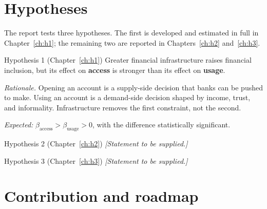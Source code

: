 \section{Hypotheses}
\label{sec:hypotheses}

The report tests three hypotheses. The first is developed and estimated in full in
Chapter~\ref{ch:h1}; the remaining two are reported in Chapters~\ref{ch:h2} and~\ref{ch:h3}.

\begin{keybox}{Hypothesis 1 (Chapter~\ref{ch:h1})}
Greater financial infrastructure raises financial inclusion, but its effect on \textbf{access} is
stronger than its effect on \textbf{usage}.

\medskip
\emph{Rationale.} Opening an account is a supply-side decision that banks can be pushed to make.
Using an account is a demand-side decision shaped by income, trust, and informality.
Infrastructure removes the first constraint, not the second.

\medskip
\emph{Expected:} $\beta_{\text{access}} > \beta_{\text{usage}} > 0$, with the difference
statistically significant.
\end{keybox}


\begin{keybox}{Hypothesis 2 (Chapter~\ref{ch:h2})}
\textit{[Statement to be supplied.]}
\end{keybox}

\begin{keybox}{Hypothesis 3 (Chapter~\ref{ch:h3})}
\textit{[Statement to be supplied.]}
\end{keybox}

\section{Contribution and roadmap}
\label{sec:contribution}

